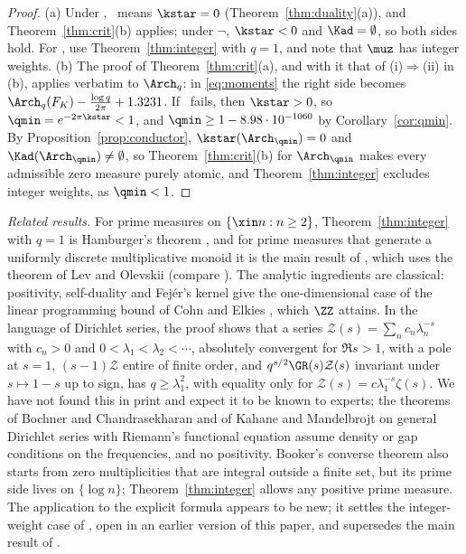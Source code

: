 \begin{proof}
(a) Under \condE, \condS\ means $\kstar=0$ (Theorem~\ref{thm:duality}(a)), and Theorem~\ref{thm:crit}(b) applies; under $\neg$\condE,
$\kstar<0$ and $\Kad=\emptyset$, so both sides hold. For \condU, use Theorem~\ref{thm:integer} with $q=1$, and note that $\muz$ has integer
weights. (b) The proof of Theorem~\ref{thm:crit}(a), and with it that of (i)$\Rightarrow$(ii) in (b), applies verbatim to $\Arch_q$: in
\eqref{eq:moments} the right side becomes $\Arch_q(F_K)-\frac{\log q}{2\pi}+1.3231$. If \condS\ fails, then $\kstar>0$, so
$\qmin=e^{-2\pi\kstar}<1$, and $\qmin\ge1-8.98\cdot10^{-1060}$ by Corollary~\ref{cor:qmin}. By Proposition~\ref{prop:conductor},
$\kstar(\Arch_{\qmin})=0$ and $\Kad(\Arch_{\qmin})\ne\emptyset$, so Theorem~\ref{thm:crit}(b) for $\Arch_{\qmin}$ makes every admissible zero
measure purely atomic, and Theorem~\ref{thm:integer} excludes integer weights, as $\qmin<1$.
\end{proof}

\emph{Related results.} For prime measures on $\{\xin n:n\ge2\}$, Theorem~\ref{thm:integer} with $q=1$ is Hamburger's theorem \cite{Ham21},
and for prime measures that generate a uniformly discrete multiplicative monoid it is the main result of \cite{N4}, which uses the theorem of
Lev and Olevskii \cite{LO15} (compare \cite{Lag99}). The analytic ingredients are classical: positivity, self-duality and Fej\'er's kernel give
the one-dimensional case of the linear programming bound of Cohn and Elkies \cite{CE03}, which $\ZZ$ attains. In the language of Dirichlet
series, the proof shows that a series $\mathcal Z(s)=\sum_nc_n\lambda_n^{-s}$ with $c_n>0$ and $0<\lambda_1<\lambda_2<\cdots$, absolutely
convergent for $\Re s>1$, with a pole at $s=1$, $(s-1)\mathcal Z$ entire of finite order, and $q^{s/2}\GR(s)\mathcal Z(s)$ invariant under
$s\mapsto1-s$ up to sign, has $q\ge\lambda_1^2$, with equality only for $\mathcal Z(s)=c\lambda_1^{-s}\zeta(s)$. We have not found this in print
and expect it to be known to experts; the theorems of Bochner and Chandrasekharan \cite{BC56} and of Kahane and Mandelbrojt \cite{KM58} on
general Dirichlet series with Riemann's functional equation assume density or gap conditions on the frequencies, and no positivity. Booker's
converse theorem \cite{Boo15} also starts from zero multiplicities that are integral outside a finite set, but its prime side lives on
$\{\log n\}$; Theorem~\ref{thm:integer} allows any positive prime measure. The application to the explicit formula appears to be new; it settles
the integer-weight case of \condU, open in an earlier version of this paper, and supersedes the main result of \cite{N4}.
